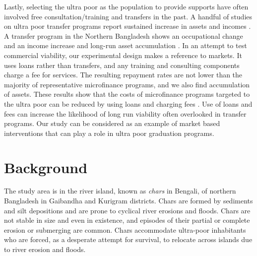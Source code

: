	Lastly, selecting the ultra poor as the population to provide supports have often involved free consultation/training and transfers in the past. A handful of studies on ultra poor transfer programs report sustained increase in assets and incomes \citep{Blattman2014, BanerjeeetalScience2015, Blattmanetal2016, HaushoferShapiro2016}. A transfer program in the Northern Bangladesh shows an occupational change and an income increase \citep{BandieraBRAC2017} and long-run asset accumulation \citep{Balboni2020}. %
	In an attempt to test commercial viability, our experimental design makes a reference to markets. It uses loans rather than transfers, and any training and consulting components charge a fee for services. The resulting repayment rates are not lower than the majority of representative microfinance programs, and we also find accumulation of assets. These results show that the costs of microfinance programs targeted to the ultra poor can be reduced by using loans and charging fees . Use of loans and fees can increase the likelihood of long run viability often overlooked in transfer programs.\label{PageOfCostsMFReduced} Our study can be considered as an example of market based interventions that can play a role in ultra poor graduation programs.


\section{Background}
\label{SecBackground}


	The study area is in the river island, known as \textit{chars} in Bengali, of northern Bangladesh in Gaibandha and Kurigram districts. Chars are formed by sediments and silt depositions and are prone to cyclical river erosions and floods. Chars are not stable in size and even in existence, and episodes of their partial or complete erosion or submerging are common. Chars accommodate ultra-poor inhabitants who are forced, as a desperate attempt for survival, to relocate across islands due to river erosion and floods.

